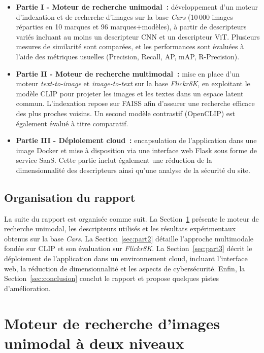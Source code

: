 \documentclass[a4paper,11pt]{article}
\begin{document}
\begin{itemize}
    \item \textbf{Partie I - Moteur de recherche unimodal~:} développement d'un moteur d'indexation et de recherche d'images sur la base \textit{Cars} (10\,000 images réparties en 10 marques et 96 marques+modèles), à partir de descripteurs variés incluant au moins un descripteur CNN et un descripteur ViT. Plusieurs mesures de similarité sont comparées, et les performances sont évaluées à l'aide des métriques usuelles (Precision, Recall, AP, mAP, R-Precision).

    \item \textbf{Partie II - Moteur de recherche multimodal~:}
    mise en place d'un moteur \textit{text-to-image} et \textit{image-to-text} sur la base \textit{Flickr8K}, en exploitant le modèle CLIP pour projeter les images et les textes dans un espace latent commun. L'indexation repose sur FAISS afin d'assurer une recherche efficace des plus proches voisins. Un second modèle contrastif (OpenCLIP) est également évalué à titre comparatif.

    \item \textbf{Partie III - Déploiement cloud~:}
    encapsulation de l'application dans une image Docker et mise à disposition via une interface web Flask sous forme de service SaaS. Cette partie inclut également une réduction de la dimensionnalité des descripteurs ainsi qu'une analyse de la sécurité du site.
\end{itemize}

\subsection{Organisation du rapport}

La suite du rapport est organisée comme suit. La Section~\ref{sec:part1} présente le moteur de recherche unimodal, les descripteurs utilisés et les résultats expérimentaux obtenus sur la base \textit{Cars}. La Section~\ref{sec:part2} détaille l'approche multimodale fondée sur CLIP et son évaluation sur \textit{Flickr8K}. La Section~\ref{sec:part3} décrit le déploiement de l'application dans un environnement cloud, incluant l'interface web, la réduction de dimensionnalité et les aspects de cybersécurité. Enfin, la Section~\ref{sec:conclusion} conclut le rapport et propose quelques pistes d'amélioration.

\newpage
\section{Moteur de recherche d'images unimodal à deux niveaux}
\label{sec:part1}
\end{document}
